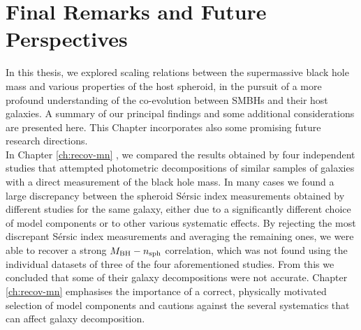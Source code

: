 \chapter{Final Remarks and Future Perspectives}
\label{ch:concl}

In this thesis, we explored scaling relations between the supermassive black hole mass 
and various properties of the host spheroid, 
in the pursuit of a more profound understanding of the co-evolution between SMBHs and their host galaxies. 
A summary of our principal findings and some additional considerations are presented here. 
This Chapter incorporates also some promising future research directions. \\

In Chapter \ref{ch:recov-mn} \citep{savorgnan2013}, we compared the results obtained by four independent studies 
\citep{grahamdriver2007,sani2011,vika2012,beifiori2012}
that attempted photometric decompositions of similar samples of galaxies with a direct measurement 
of the black hole mass. 
In many cases we found a large discrepancy between the spheroid S\'ersic index measurements 
obtained by different studies for the same galaxy, 
either due to a significantly different choice of model components 
or to other various systematic effects. 
By rejecting the most discrepant S\'ersic index measurements and averaging the remaining ones, 
we were able to recover a strong $M_{\rm BH} - n_{\rm sph}$ correlation, 
which was not found using the individual datasets of three of the four aforementioned studies. 
From this we concluded that some of their galaxy decompositions were not accurate. 
Chapter \ref{ch:recov-mn} emphasises the importance of a correct, physically motivated selection of model components 
and cautions against the several systematics that can affect galaxy decomposition. \\

